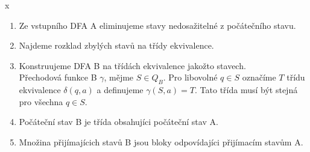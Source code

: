 \documentclass[../main.tex]{subfiles}
\begin{document}
\begin{theorem}
    {\color{white} x}

    \begin{enumerate}
        \item Ze vstupního DFA A eliminujeme stavy nedosažitelné z počátečního stavu.
        \item Najdeme rozklad zbylých stavů na třídy ekvivalence.
        \item Konstruujeme DFA B na třídách ekvivalence jakožto stavech.\\
        Přechodová funkce B $\gamma$, mějme $S\in Q_B$. Pro libovolné $q\in S$ označíme $T$ třídu ekvivalence
        $\delta(q,a)$ a definujeme $\gamma(S,a) = T.$ Tato třída musí být stejná pro všechna $q\in S$.
        \item Počáteční stav B je třída obsahujíci počáteční stav A.
        \item Množina přijímajícich stavů B jsou bloky odpovídajíci přijímacím stavům A.
    \end{enumerate}
\end{theorem}
\end{document}
